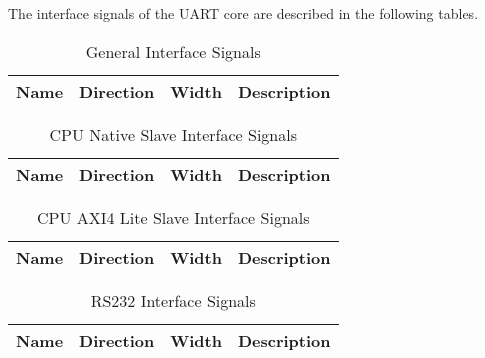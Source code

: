 \label{sec:is}

The interface signals of the UART core are described in the following tables.

\begin{table}[H]
  \centering
  \begin{tabular}{|l|l|r|p{10.5cm}|}
    
    \hline
    \rowcolor{iob-green}
    {\bf Name} & {\bf Direction} & {\bf Width} & {\bf Description}  \\ \hline \hline

    
 
  \end{tabular}
  \caption{General Interface Signals}
  \label{gen_is_tab:is}
\end{table}

\begin{table}[H]
  \centering
  \begin{tabular}{|l|l|r|p{10.5cm}|}
    
    \hline
    \rowcolor{iob-green}
    {\bf Name} & {\bf Direction} & {\bf Width} & {\bf Description}  \\ \hline \hline

    
 
  \end{tabular}
  \caption{CPU Native Slave Interface Signals}
  \label{cpu_nat_s_is_tab:is}
\end{table}

\begin{table}[H]
  \centering
  \begin{tabular}{|l|l|r|p{9.5cm}|}
    
    \hline
    \rowcolor{iob-green}
    {\bf Name} & {\bf Direction} & {\bf Width} & {\bf Description}  \\ \hline \hline

    
 
  \end{tabular}
  \caption{CPU AXI4 Lite Slave Interface Signals}
  \label{cpu_axi4lite_s_is_tab:is}
\end{table}


\begin{table}[H]
  \centering
  \begin{tabular}{|l|l|r|p{9.5cm}|}
    
    \hline
    \rowcolor{iob-green}
    {\bf Name} & {\bf Direction} & {\bf Width} & {\bf Description}  \\ \hline \hline

    
 
  \end{tabular}
  \caption{RS232 Interface Signals}
  \label{cpu_axi4lite_s_is_tab:is}
\end{table}

